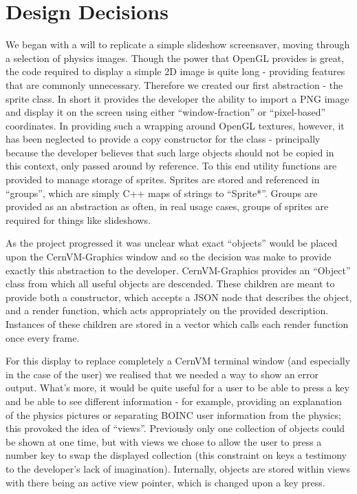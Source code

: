 \documentclass[twocolumn,aps]{revtex4}
\newcommand{\cernvm}{CernVM}
\newcommand{\cernvmgraphics}{\cernvm{}-Graphics}
\newcommand{\boinc}{BOINC}
\newcommand{\opengl}{OpenGL}
\newcommand{\json}{JSON}
\begin{document}
  \section{ Design Decisions }
    We began with a will to replicate a simple slideshow screensaver, moving
    through a selection of physics images. Though the power that \opengl{} 
    provides is great, the code required to display a simple 2D image is 
    quite long - providing features that are commonly unnecessary. 
    Therefore we created our first abstraction - the sprite class. In short 
    it provides the developer the ability to import a PNG image and display 
    it on the screen using either ``window-fraction'' or ``pixel-based'' 
    coordinates. In providing such a wrapping around \opengl{} textures, 
    however, it has been neglected to provide a copy constructor for the 
    class - principally because the developer believes that such large 
    objects should not be copied in this context, only passed around by 
    reference. To this end utility functions are provided to manage storage 
    of sprites. Sprites are stored and referenced in ``groups'', which are
    simply C++ maps of strings to ``Sprite*''. Groups are provided as an
    abstraction as often, in real usage cases, groups of sprites are
    required for things like slideshows.

    As the project progressed it was unclear what exact ``objects'' would be
    placed upon the \cernvmgraphics{} window and so the decision was make
    to provide exactly this abstraction to the developer. \cernvmgraphics{}
    provides an ``Object'' class from which all useful objects are
    descended. These children are meant to provide both a constructor, which
    accepts a \json{} node that describes the object, and a render function,
    which acts appropriately on the provided description. Instances of these
    children are stored in a vector which calls each render function once 
    every frame.

    For this display to replace completely a \cernvm{} terminal window (and 
    especially in the case of the user) we realised that we needed a way to 
    show an error output. What's more, it would be quite useful for a 
    user to be able to press a key and be able to see different information
    - for example, providing an explanation of the physics pictures or
    separating \boinc{} user information from the physics; this provoked the
    idea of ``views''. Previously only one collection of objects  could be 
    shown at one time, but with views we chose to allow the user to press
    a number key to swap the displayed collection (this constraint on keys a
    testimony to the developer's lack of imagination). Internally, objects
    are stored within views with there being an active view pointer, which
    is changed upon a key press.
\end{document}
